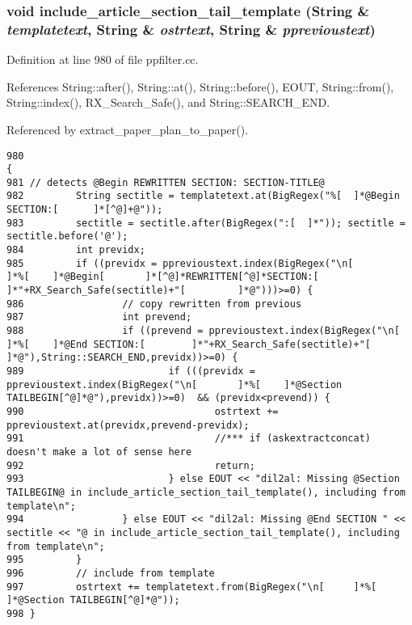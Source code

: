 \subsubsection{\setlength{\rightskip}{0pt plus 5cm}void include\_\-article\_\-section\_\-tail\_\-template ({\bf String} \& {\em templatetext}, {\bf String} \& {\em ostrtext}, {\bf String} \& {\em pprevioustext})}\label{ppfilter_8cc_a25}




Definition at line 980 of file ppfilter.cc.

References String::after(), String::at(), String::before(), EOUT, String::from(), String::index(), RX\_\-Search\_\-Safe(), and String::SEARCH\_\-END.

Referenced by extract\_\-paper\_\-plan\_\-to\_\-paper().



\footnotesize\begin{verbatim}980                                                                                                              {
981 // detects @Begin REWRITTEN SECTION: SECTION-TITLE@
982         String sectitle = templatetext.at(BigRegex("%[  ]*@Begin SECTION:[      ]*[^@]+@"));
983         sectitle = sectitle.after(BigRegex(":[  ]*")); sectitle = sectitle.before('@');
984         int previdx;
985         if ((previdx = pprevioustext.index(BigRegex("\n[        ]*%[    ]*@Begin[       ]*[^@]*REWRITTEN[^@]*SECTION:[  ]*"+RX_Search_Safe(sectitle)+"[         ]*@")))>=0) {
986                 // copy rewritten from previous
987                 int prevend;
988                 if ((prevend = pprevioustext.index(BigRegex("\n[        ]*%[    ]*@End SECTION:[        ]*"+RX_Search_Safe(sectitle)+"[         ]*@"),String::SEARCH_END,previdx))>=0) {
989                         if (((previdx = pprevioustext.index(BigRegex("\n[       ]*%[    ]*@Section TAILBEGIN[^@]*@"),previdx))>=0)  && (previdx<prevend)) {
990                                 ostrtext += pprevioustext.at(previdx,prevend-previdx);
991                                 //*** if (askextractconcat) doesn't make a lot of sense here
992                                 return;
993                         } else EOUT << "dil2al: Missing @Section TAILBEGIN@ in include_article_section_tail_template(), including from template\n";
994                 } else EOUT << "dil2al: Missing @End SECTION " << sectitle << "@ in include_article_section_tail_template(), including from template\n";
995         }
996         // include from template
997         ostrtext += templatetext.from(BigRegex("\n[     ]*%[    ]*@Section TAILBEGIN[^@]*@"));
998 }
\end{verbatim}\normalsize 
{}

